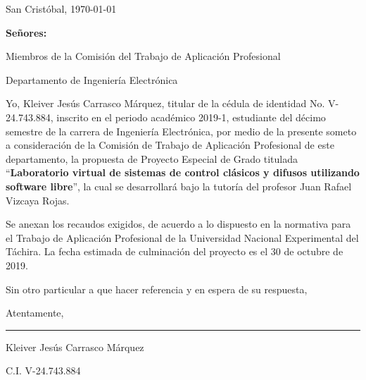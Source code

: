 \begin{titlepage}
\setcounter{page}{2}
\setlength{\parindent}{1.5cm}					%
\setlength{\parskip}{0pt}						%

\begin{flushright}
	San Cristóbal, \today
\end{flushright}

\vspace{1cm}
\vfill

\begin{flushleft}
		\singlespacing
		\setlength{\parskip}{0pt}
		
		\textbf{Señores:}
		
		Miembros de la Comisión del Trabajo de Aplicación Profesional
		
		Departamento de Ingeniería Electrónica
		
\end{flushleft}

\vfill
\begin{spacing}{1.5}
	Yo, Kleiver Jesús Carrasco Márquez, titular de la cédula de identidad No. \mbox{V-24.743.884}, inscrito en el periodo académico 2019-1, estudiante del décimo semestre de la carrera de Ingeniería Electrónica, por medio de la presente someto a consideración de la Comisión de Trabajo de Aplicación Profesional de este departamento, la propuesta de Proyecto Especial de Grado titulada \enquote{\textbf{Laboratorio virtual de sistemas de control clásicos y difusos utilizando software libre}}, la cual se desarrollará bajo la tutoría del profesor Juan Rafael Vizcaya Rojas.
	
	Se anexan los recaudos exigidos, de acuerdo a lo dispuesto en la normativa para el Trabajo de Aplicación Profesional de la Universidad Nacional Experimental del Táchira. La fecha estimada de culminación del proyecto es el 30 de octubre de 2019.
	
	Sin otro particular a que hacer referencia y en espera de su respuesta,
	
	\setlength{\parskip}{20pt} 
	
	\noindent Atentamente,
\end{spacing}

\vfill

\begin{center}
	
	\rule{6cm}{1pt}
	
	\vspace{0.2cm}
	
	Kleiver Jesús Carrasco Márquez
	
	\setlength{\parskip}{0pt}
	
	C.I. V-24.743.884
\end{center}

\vspace{0.5cm}
\end{titlepage}